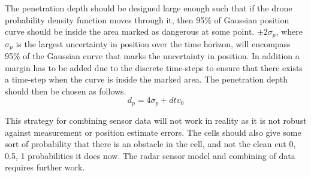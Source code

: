 The penetration depth should be designed large enough such that if the drone probability density function moves through it, then 95\% of Gaussian position curve should be inside the area marked as dangerous at some point. $\pm2 \sigma_p$, where $\sigma_p$ is the largest uncertainty in position over the time horizon, will encompass 95\% of the Gaussian curve that marks the uncertainty in position. In addition a margin has to be added due to the discrete time-steps to ensure that there exists a time-step when the curve is inside the marked area. The penetration depth should then be chosen as follows.
    \begin{equation}
        d_p = 4\sigma_p +dt v_0 \label{penetration_deapth}
    \end{equation}


This strategy for combining sensor data will not work in reality as it is not robust against measurement or position estimate errors. The cells should also give some sort of probability that there is an obstacle in the cell, and not the clean cut 0, 0.5, 1 probabilities it does now. The radar sensor model and combining of data requires further work. 